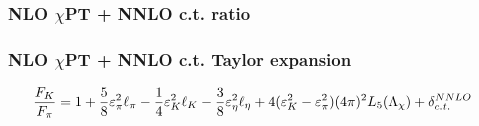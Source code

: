\documentclass[prd,11pt,tightenlines,preprintnumbers,showpacs,superscriptaddress,notitlepage,nofootinbib,eqsecnum,floatfix]{revtex4-1}
\begin{document}
\subsubsection{NLO $\chi$PT + NNLO c.t. ratio}


\subsubsection{NLO $\chi$PT + NNLO c.t. Taylor expansion}
\begin{align}\label{eq:fkfpi_chpt}
\frac{F_K}{F_\pi} &= 1
	+\frac{5}{8} {\varepsilon}_\pi^2 \ell_\pi
	-\frac{1}{4} {\varepsilon}_K^2 \ell_K
	-\frac{3}{8} {\varepsilon}_\eta^2 \ell_\eta
	+4({\varepsilon}_K^2 - {\varepsilon}_\pi^2) (4\pi)^2 L_5({\Lambda}_{\chi})
	+ {\delta}_{c.t.}^{NNLO}
\end{align}
\end{document}
